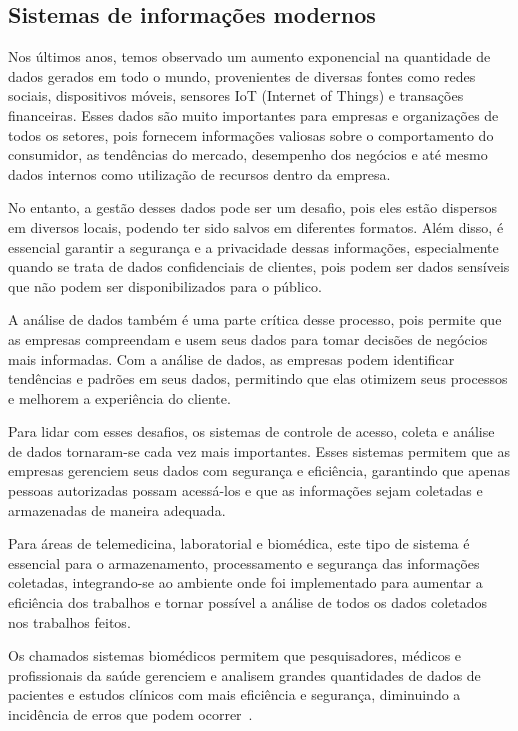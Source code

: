 \subsection{Sistemas de informações modernos}


Nos últimos anos, temos observado um aumento exponencial na quantidade de dados gerados em todo o mundo, provenientes de diversas fontes como redes sociais, dispositivos móveis, sensores IoT (Internet of Things) e transações financeiras.
Esses dados são muito importantes para empresas e organizações de todos os setores, pois fornecem informações valiosas sobre o comportamento do consumidor, as tendências do mercado, desempenho dos negócios e até mesmo dados internos como utilização de recursos dentro da empresa.

No entanto, a gestão desses dados pode ser um desafio, pois eles estão dispersos em diversos locais, podendo ter sido salvos em diferentes formatos. Além disso, é essencial garantir a segurança e a privacidade dessas informações, especialmente quando se trata de dados confidenciais de clientes, pois podem ser dados sensíveis que não podem ser disponibilizados para o público.

A análise de dados também é uma parte crítica desse processo, pois permite que as empresas compreendam e usem seus dados para tomar decisões de negócios mais informadas. Com a análise de dados, as empresas podem identificar tendências e padrões em seus dados, permitindo que elas otimizem seus processos e melhorem a experiência do cliente.

Para lidar com esses desafios, os sistemas de controle de acesso, coleta e análise de dados tornaram-se cada vez mais importantes. Esses sistemas permitem que as empresas gerenciem seus dados com segurança e eficiência, garantindo que apenas pessoas autorizadas possam acessá-los e que as informações sejam coletadas e armazenadas de maneira adequada.

Para áreas de telemedicina, laboratorial e biomédica, este tipo de sistema é essencial para o armazenamento, processamento e segurança das informações coletadas, integrando-se ao ambiente onde foi implementado para aumentar a eficiência dos trabalhos e tornar possível a análise de todos os dados coletados nos trabalhos feitos.

Os chamados sistemas biomédicos permitem que pesquisadores, médicos e profissionais da saúde gerenciem e analisem grandes quantidades de dados de pacientes e estudos clínicos com mais eficiência e segurança, diminuindo a incidência de erros que podem ocorrer~\cite{Sun2021LaboratoryEfficiency}.

